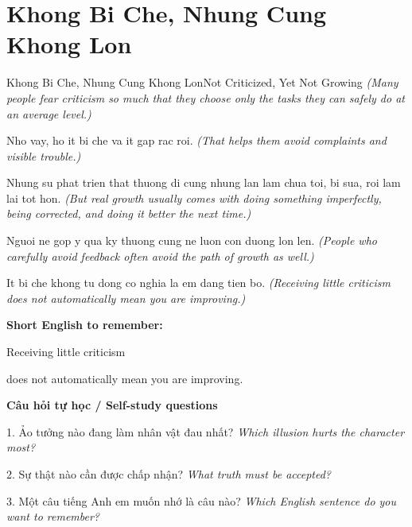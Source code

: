 \section{Khong Bi Che, Nhung Cung Khong Lon}
\begin{truyen}{Khong Bi Che, Nhung Cung Khong Lon}{Not Criticized, Yet Not Growing}
\textit{(Many people fear criticism so much that they choose only the tasks they can safely do at an average level.)}

Nho vay, ho it bi che va it gap rac roi.
\textit{(That helps them avoid complaints and visible trouble.)}

Nhung su phat trien that thuong di cung nhung lan lam chua toi, bi sua, roi lam lai tot hon.
\textit{(But real growth usually comes with doing something imperfectly, being corrected, and doing it better the next time.)}

Nguoi ne gop y qua ky thuong cung ne luon con duong lon len.
\textit{(People who carefully avoid feedback often avoid the path of growth as well.)}

\end{truyen}

\begin{baihoc}
It bi che khong tu dong co nghia la em dang tien bo.
\textit{(Receiving little criticism does not automatically mean you are improving.)}
\end{baihoc}

\begin{ghinhoanh}
\textbf{Short English to remember:}

Receiving little criticism

does not automatically mean you are improving.

\end{ghinhoanh}

\begin{tuhocnhanh}
\textbf{Câu hỏi tự học / Self-study questions}

1. Ảo tưởng nào đang làm nhân vật đau nhất? \textit{Which illusion hurts the character most?}

2. Sự thật nào cần được chấp nhận? \textit{What truth must be accepted?}

3. Một câu tiếng Anh em muốn nhớ là câu nào? \textit{Which English sentence do you want to remember?}
\end{tuhocnhanh}
\ngancach


